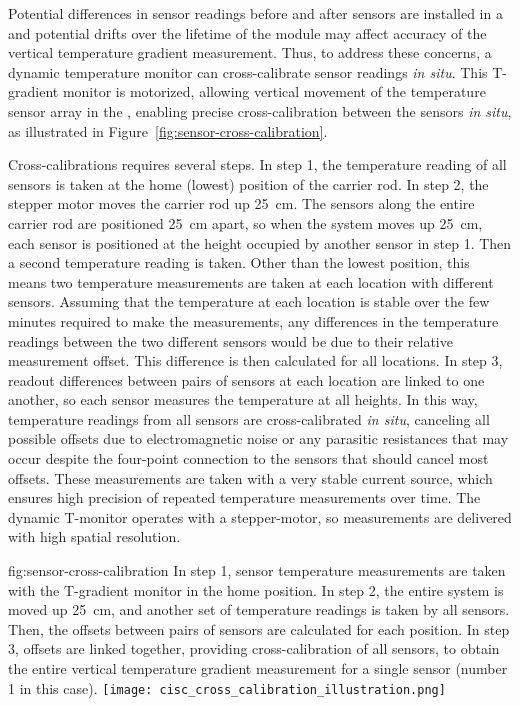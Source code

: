  Potential differences in sensor readings before and after sensors are installed in a  and potential drifts over the lifetime of the %
 module may affect accuracy of the vertical temperature gradient measurement. Thus, to address these concerns, %
 a dynamic temperature monitor can cross-calibrate  sensor readings %
 \textit{in situ}.
This T-gradient monitor is motorized, allowing vertical movement of the temperature sensor array %
in the , %
enabling precise cross-calibration between the sensors %
\textit{in situ}, as illustrated in Figure~\ref{fig:sensor-cross-calibration}.  

Cross-calibrations requires several steps. In step 1, the temperature reading  of all sensors is taken at the home (lowest) position of the carrier rod. In  step 2, the stepper motor moves the carrier rod up \SI{25}{cm}. The sensors along the entire  carrier rod are positioned \SI{25}{cm} apart, so when the system moves up \SI{25}{cm}, each sensor is positioned at the height occupied by another sensor in step 1. Then a second temperature reading is taken. Other than the lowest position, this means two temperature measurements are taken at each location with %
different sensors. Assuming that the temperature at each location is stable over the few minutes required to make the measurements, %
any differences in the temperature readings between the two different sensors would be due to their relative measurement offset. This %
difference is then calculated for all locations.  In step 3, readout differences between pairs of sensors at each location are linked to one another, so each sensor measures the temperature at all heights. In this way, temperature readings from all sensors are cross-calibrated %
\textit{in situ}, canceling all possible offsets due to electromagnetic noise or any parasitic resistances that may occur despite the four-point connection to the sensors that should cancel most offsets. These measurements are taken with a very stable current source, which ensures high precision of repeated temperature measurements over time. The dynamic T-monitor operates with a stepper-motor, so measurements are delivered with high spatial resolution. 

\begin{dunefigure}{fig:sensor-cross-calibration}
  {In step 1, sensor temperature measurements are taken with the T-gradient monitor in the home position. In step 2, the entire system is moved up \SI{25}{cm}, and another set of temperature readings is taken by all sensors. Then, the offsets between pairs of sensors are calculated for each position. In step 3, offsets are linked together, providing cross-calibration of all sensors, to obtain the entire vertical temperature gradient measurement for a single sensor (number 1 in this case). }
  \texttt{[image: cisc\_cross\_calibration\_illustration.png]}%
\end{dunefigure}


